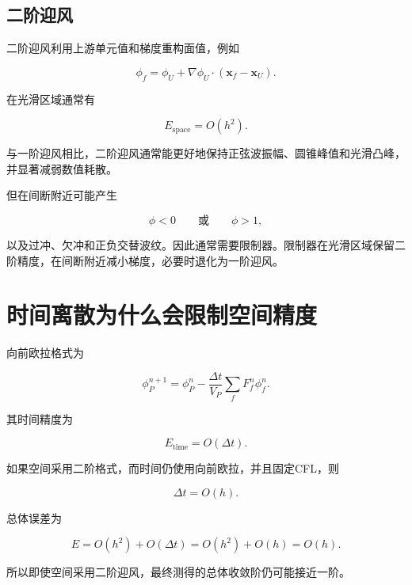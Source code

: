 \documentclass[UTF8,12pt,a4paper,fontset=fandol]{ctexart}
\begin{document}
\subsection{二阶迎风}

二阶迎风利用上游单元值和梯度重构面值，例如

\begin{equation}
\phi_f
=
\phi_U
+
\nabla\phi_U\cdot
(\bm x_f-\bm x_U).
\end{equation}

在光滑区域通常有

\begin{equation}
E_{\mathrm{space}}=O(h^2).
\end{equation}

与一阶迎风相比，二阶迎风通常能更好地保持正弦波振幅、圆锥峰值和光滑凸峰，并显著减弱数值耗散。

但在间断附近可能产生

\begin{equation}
\phi<0
\qquad\text{或}\qquad
\phi>1,
\end{equation}

以及过冲、欠冲和正负交替波纹。因此通常需要限制器。限制器在光滑区域保留二阶精度，在间断附近减小梯度，必要时退化为一阶迎风。

\section{时间离散为什么会限制空间精度}

向前欧拉格式为

\begin{equation}
\phi_P^{n+1}
=
\phi_P^n
-\frac{\Delta t}{V_P}
\sum_fF_f^n\phi_f^n.
\end{equation}

其时间精度为

\begin{equation}
E_{\mathrm{time}}=O(\Delta t).
\end{equation}

如果空间采用二阶格式，而时间仍使用向前欧拉，并且固定CFL，则

\begin{equation}
\Delta t=O(h).
\end{equation}

总体误差为

\begin{equation}
E
=
O(h^2)+O(\Delta t)
=
O(h^2)+O(h)
=
O(h).
\end{equation}

所以即使空间采用二阶迎风，最终测得的总体收敛阶仍可能接近一阶。
\end{document}
